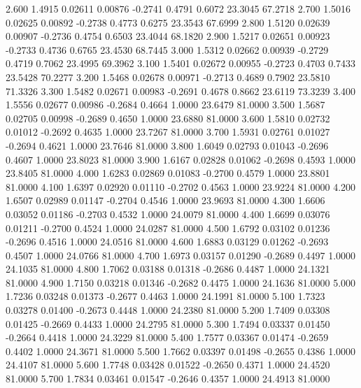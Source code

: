    2.600   1.4915   0.02611   0.00876  -0.2741   0.4791   0.6072  23.3045  67.2718
   2.700   1.5016   0.02625   0.00892  -0.2738   0.4773   0.6275  23.3543  67.6999
   2.800   1.5120   0.02639   0.00907  -0.2736   0.4754   0.6503  23.4044  68.1820
   2.900   1.5217   0.02651   0.00923  -0.2733   0.4736   0.6765  23.4530  68.7445
   3.000   1.5312   0.02662   0.00939  -0.2729   0.4719   0.7062  23.4995  69.3962
   3.100   1.5401   0.02672   0.00955  -0.2723   0.4703   0.7433  23.5428  70.2277
   3.200   1.5468   0.02678   0.00971  -0.2713   0.4689   0.7902  23.5810  71.3326
   3.300   1.5482   0.02671   0.00983  -0.2691   0.4678   0.8662  23.6119  73.3239
   3.400   1.5556   0.02677   0.00986  -0.2684   0.4664   1.0000  23.6479  81.0000
   3.500   1.5687   0.02705   0.00998  -0.2689   0.4650   1.0000  23.6880  81.0000
   3.600   1.5810   0.02732   0.01012  -0.2692   0.4635   1.0000  23.7267  81.0000
   3.700   1.5931   0.02761   0.01027  -0.2694   0.4621   1.0000  23.7646  81.0000
   3.800   1.6049   0.02793   0.01043  -0.2696   0.4607   1.0000  23.8023  81.0000
   3.900   1.6167   0.02828   0.01062  -0.2698   0.4593   1.0000  23.8405  81.0000
   4.000   1.6283   0.02869   0.01083  -0.2700   0.4579   1.0000  23.8801  81.0000
   4.100   1.6397   0.02920   0.01110  -0.2702   0.4563   1.0000  23.9224  81.0000
   4.200   1.6507   0.02989   0.01147  -0.2704   0.4546   1.0000  23.9693  81.0000
   4.300   1.6606   0.03052   0.01186  -0.2703   0.4532   1.0000  24.0079  81.0000
   4.400   1.6699   0.03076   0.01211  -0.2700   0.4524   1.0000  24.0287  81.0000
   4.500   1.6792   0.03102   0.01236  -0.2696   0.4516   1.0000  24.0516  81.0000
   4.600   1.6883   0.03129   0.01262  -0.2693   0.4507   1.0000  24.0766  81.0000
   4.700   1.6973   0.03157   0.01290  -0.2689   0.4497   1.0000  24.1035  81.0000
   4.800   1.7062   0.03188   0.01318  -0.2686   0.4487   1.0000  24.1321  81.0000
   4.900   1.7150   0.03218   0.01346  -0.2682   0.4475   1.0000  24.1636  81.0000
   5.000   1.7236   0.03248   0.01373  -0.2677   0.4463   1.0000  24.1991  81.0000
   5.100   1.7323   0.03278   0.01400  -0.2673   0.4448   1.0000  24.2380  81.0000
   5.200   1.7409   0.03308   0.01425  -0.2669   0.4433   1.0000  24.2795  81.0000
   5.300   1.7494   0.03337   0.01450  -0.2664   0.4418   1.0000  24.3229  81.0000
   5.400   1.7577   0.03367   0.01474  -0.2659   0.4402   1.0000  24.3671  81.0000
   5.500   1.7662   0.03397   0.01498  -0.2655   0.4386   1.0000  24.4107  81.0000
   5.600   1.7748   0.03428   0.01522  -0.2650   0.4371   1.0000  24.4520  81.0000
   5.700   1.7834   0.03461   0.01547  -0.2646   0.4357   1.0000  24.4913  81.0000

